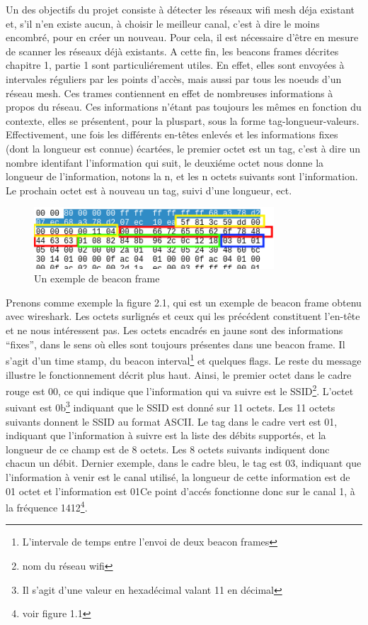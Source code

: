 Un des objectifs du projet consiste à détecter les réseaux wifi mesh déja existant et, s'il n'en existe aucun, à choisir le
meilleur canal, c'est à dire le moins encombré, pour en créer un nouveau. Pour cela, il est nécessaire d'être en mesure de scanner
les réseaux déjà existants. A cette fin, les beacons frames décrites chapitre 1, partie 1 sont particuliérement utiles. En effet,
elles sont envoyées à intervales réguliers par les points d'accès, mais aussi par tous les noeuds d'un réseau mesh. Ces trames 
contiennent en effet de nombreuses informations à propos du réseau. Ces informations n'étant pas toujours les mêmes en fonction du 
contexte, elles se présentent, pour la pluspart, sous la forme tag-longueur-valeurs. Effectivement, une fois les différents en-têtes 
enlevés et les informations fixes (dont la longueur est connue) écartées, le premier octet est un tag, c'est à dire un nombre 
identifant l'information qui suit, le deuxiéme octet nous donne la longueur de l'information, notons la n, et les n octets suivants
sont l'information. Le prochain octet est à nouveau un tag, suivi d'une longueur, ect.

\begin{figure}
   \centering
   \includegraphics[width=0.8\textwidth,natwidth=610,natheight=642]{images/beacon_frame.png}
   \caption{Un exemple de beacon frame}
\end{figure}

Prenons comme exemple la figure 2.1, qui est un exemple de beacon frame obtenu avec wireshark. Les octets surlignés et ceux qui
les précédent constituent l'en-tête et ne nous intéressent pas. Les octets encadrés en jaune sont des informations ``fixes'', dans
le sens où elles sont toujours présentes dans une beacon frame. Il s'agit d'un time stamp, du beacon interval\footnote{L'intervale
de temps entre l'envoi de deux beacon frames} et quelques flags. Le reste du message illustre le fonctionnement décrit plus
haut. Ainsi, le premier octet dans le cadre rouge est 00, ce qui indique que l'information qui va suivre est le SSID\footnote{nom du
réseau wifi}. L'octet suivant est 0b\footnote{Il s'agit d'une valeur en hexadécimal valant 11 en décimal} indiquant que le SSID est
donné sur 11 octets. Les 11 octets suivants donnent le SSID au format ASCII. Le tag dans le cadre vert est 01, indiquant que 
l'information à suivre est la liste des débits supportés, et la longueur de ce champ est de 8 octets. Les 8 octets suivants indiquent
donc chacun un débit. Dernier exemple, dans le cadre bleu, le tag est 03, indiquant que l'information à venir est le canal utilisé, la 
longueur de cette information est de 01 octet et l'information est 01Ce point d'accés fonctionne donc sur le canal 1, à la
fréquence 1412\footnote{voir figure 1.1}.

